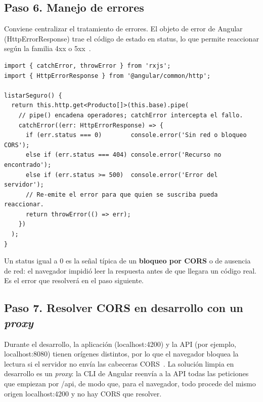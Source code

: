 \documentclass[11pt,a4paper]{article}
\newcommand{\code}[1]{{\ttfamily\color{ngdark}#1}}
\begin{document}
\subsection*{Paso 6. Manejo de errores}

Conviene centralizar el tratamiento de errores. El objeto de error de Angular (\code{HttpErrorResponse}) trae el código de estado en \code{status}, lo que permite reaccionar según la familia \code{4xx} o \code{5xx}~\cite{rfc9110}.

\begin{lstlisting}[caption={Manejo de errores con el operador catchError de RxJS.},label={lst:errores}]
import { catchError, throwError } from 'rxjs';
import { HttpErrorResponse } from '@angular/common/http';

listarSeguro() {
  return this.http.get<Producto[]>(this.base).pipe(
    // pipe() encadena operadores; catchError intercepta el fallo.
    catchError((err: HttpErrorResponse) => {
      if (err.status === 0)        console.error('Sin red o bloqueo CORS');
      else if (err.status === 404) console.error('Recurso no encontrado');
      else if (err.status >= 500)  console.error('Error del servidor');
      // Re-emite el error para que quien se suscriba pueda reaccionar.
      return throwError(() => err);
    })
  );
}
\end{lstlisting}

\begin{nota}
	Un \code{status} igual a \code{0} es la señal típica de un \textbf{bloqueo por CORS} o de ausencia de red: el navegador impidió leer la respuesta antes de que llegara un código real. Es el error que resolverá en el paso siguiente.
\end{nota}

\subsection*{Paso 7. Resolver CORS en desarrollo con un \emph{proxy}}

Durante el desarrollo, la aplicación (\code{localhost:4200}) y la API (por ejemplo, \code{localhost:8080}) tienen orígenes distintos, por lo que el navegador bloquea la lectura si el servidor no envía las cabeceras CORS~\cite{mdncors}. La solución limpia en desarrollo es un \emph{proxy}: la CLI de Angular reenvía a la API todas las peticiones que empiezan por \code{/api}, de modo que, para el navegador, todo procede del mismo origen \code{localhost:4200} y no hay CORS que resolver.
\end{document}
